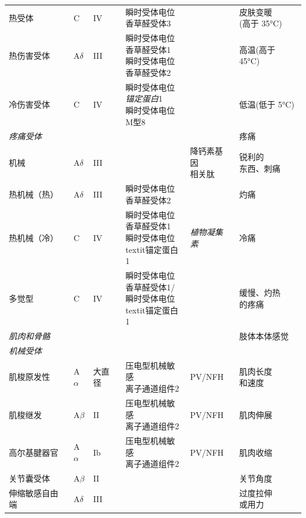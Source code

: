 \begin{table}[htbp]
\begin{tabular}{llllll}
		热受体 & C & IV & \makecell[l]{瞬时受体电位\\香草醛受体3} &  & \makecell[l]{皮肤变暖\\(高于 35°C)} \\
		热伤害受体 & A$\delta$ & III & \makecell[l]{瞬时受体电位\\香草醛受体1\\瞬时受体电位\\香草醛受体2} &  & 高温(高于 45°C) \\
		冷伤害受体 & C & IV & \makecell[l]{瞬时受体电位\\\textit{锚定蛋白}1\\瞬时受体电位\\M型8} &  & 低温(低于 5°C) \\
		\textit{疼痛受体} &  &  & &  & 疼痛 \\
		机械 & A$\delta$ & III & & \makecell{降钙素基因\\相关肽} & \makecell[l]{锐利的\\东西、刺痛} \\
		热机械（热） & A$\delta$ & III & \makecell[l]{瞬时受体电位\\香草醛受体2} &  & 灼痛 \\
		热机械（冷） & C & IV & \makecell[l]{瞬时受体电位\\香草醛受体1\\瞬时受体电位\\textit{锚定蛋白}1} & \textit{植物凝集素} & 冷痛 \\
		多觉型 & C & IV & \makecell[l]{瞬时受体电位\\香草醛受体1/\\瞬时受体电位\\textit{锚定蛋白}1} &  & \makecell[l]{缓慢、灼热\\的疼痛} \\
		\textit{肌肉和骨骼} &  &  &  &  & 肢体本体感觉 \\
		\textit{机械受体} &  &  &  &  &  \\
		肌梭原发性 & A$\alpha$ & 大直径 & \makecell[l]{压电型机械敏感\\离子通道组件}2 & PV/NFH & \makecell[l]{肌肉长度\\和速度} \\
		肌梭继发 & A$\beta$ & II & \makecell[l]{压电型机械敏感\\离子通道组件}2 & PV/NFH & 肌肉伸展 \\
		高尔基腱器官 & A$\alpha$ & Ib & \makecell[l]{压电型机械敏感\\离子通道组件}2 & PV/NFH & 肌肉收缩 \\
		关节囊受体 & A$\beta$ & II &  &  & 关节角度 \\
		伸缩敏感自由端 & A$\delta$ & III &  &  & \makecell[l]{过度拉伸\\或用力} \\
		\bottomrule
	\end{tabular}
\end{table}


